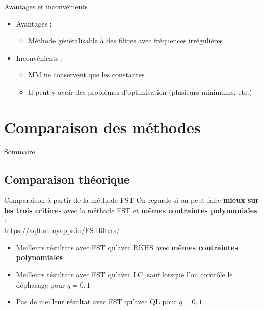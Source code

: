 \documentclass[10pt,xcolor=table,color={dvipsnames,usenames},ignorenonframetext,usepdftitle=false,french]{beamer}
\providecommand{\tightlist}{%
  \setlength{\parskip}{0pt}
  }
\newcommand\1{\mathds{1}}
\begin{document}
\begin{frame}{Avantages et inconvénients}
\protect\hypertarget{avantages-et-inconvuxe9nients}{}
\begin{summary}

\begin{itemize}
\item
  \bcsmbh Avantages :

  \begin{itemize}
  \tightlist
  \item
    Méthode généralisable à des filtres avec fréquences irrégulières
  \end{itemize}
\item
  \bcsmmh Inconvénients :

  \begin{itemize}
  \item
    MM ne conservent que les constantes
  \item
    Il peut y avoir des problèmes d'optimisation (plusieurs minimums,
    etc.)
  \end{itemize}
\end{itemize}

\end{summary}
\end{frame}

\hypertarget{comparaison-des-muxe9thodes}{%
\section{Comparaison des méthodes}\label{comparaison-des-muxe9thodes}}

\begin{frame}[noframenumbering]{Sommaire}
\protect\hypertarget{sommaire-2}{}
\end{frame}

\hypertarget{comparaison-thuxe9orique}{%
\subsection{Comparaison théorique}\label{comparaison-thuxe9orique}}

\begin{frame}{Comparaison à partir de la méthode FST}
\protect\hypertarget{comparaison-uxe0-partir-de-la-muxe9thode-fst}{}
On regarde si on peut faire \textbf{mieux sur les trois critères} avec
la méthode FST et \textbf{mêmes contraintes polynomiales} :\\
\faDesktop{} \url{https://aqlt.shinyapps.io/FSTfilters/}

\pause

\begin{itemize}
\item
  Meilleurs résultats avec FST qu'avec RKHS avec \textbf{mêmes
  contraintes polynomiales}
\item
  Meilleurs résultats avec FST qu'avec LC, sauf lorsque l'on contrôle le
  déphasage pour \(q=0,1\)
\item
  Pas de meilleur résultat avec FST qu'avec QL pour \(q=0,1\)
\end{itemize}
\end{frame}
\end{document}
